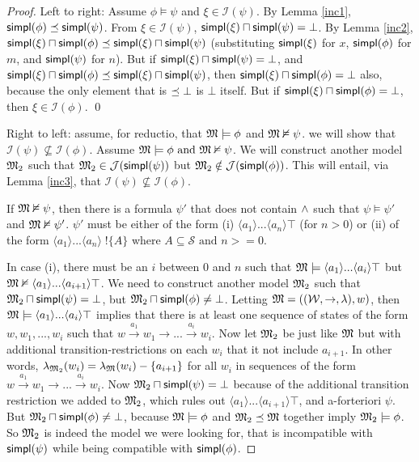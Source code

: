\begin{proof}

Left to right: Assume $\phi \models \psi$ and $\xi \in \mathcal{I}(\psi)$.  By
Lemma \ref{inc1}, $\mathsf{simpl}(\phi) \preceq \mathsf{simpl}(\psi)$.  From $\xi \in \mathcal{I}(\psi)$,
$\mathsf{simpl}(\xi) \sqcap \mathsf{simpl}(\psi) = \bot$.  By Lemma \ref{inc2}, $\mathsf{simpl}(\xi) \sqcap
\mathsf{simpl}(\phi) \preceq \mathsf{simpl}(\xi) \sqcap \mathsf{simpl}(\psi)$ (substituting $\mathsf{simpl}(\xi)$
for $x$, $\mathsf{simpl}(\phi)$ for $m$, and $\mathsf{simpl}(\psi)$ for $n$).  But if
$\mathsf{simpl}(\xi) \sqcap \mathsf{simpl}(\psi) = \bot$, and $\mathsf{simpl}(\xi) \sqcap \mathsf{simpl}(\phi)
\preceq \mathsf{simpl}(\xi) \sqcap \mathsf{simpl}(\psi)$, then $\mathsf{simpl}(\xi) \sqcap \mathsf{simpl}(\phi) =
\bot$ also, because the only element that is $\preceq \bot$ is $\bot$
itself.  But if $\mathsf{simpl}(\xi) \sqcap \mathsf{simpl}(\phi) = \bot$, then $\xi \in
\mathcal{I}(\phi)$.  \qed

Right to left: assume, for reductio, that $\frak{M} \models \phi$ and $\frak{M} \nvDash
\psi$. we will show that $\mathcal{I}(\psi) \nsubseteq \mathcal{I}(\phi)$.
Assume $\frak{M} \models \phi \mbox{ and } \frak{M} \nvDash \psi$. We will construct
another model $\frak{M}_2$ such that $\frak{M}_2 \in \mathcal{J}(\mathsf{simpl}(\psi))$ but $\frak{M}_2
\notin \mathcal{J}(\mathsf{simpl}(\phi))$.  This will entail, via Lemma \ref{inc3}, that
$\mathcal{I}(\psi) \nsubseteq \mathcal{I}(\phi)$.

If $\frak{M} \nvDash \psi$, then there is a formula $\psi'$ that does not contain
$\land$ such that $\psi \models \psi'$ and $\frak{M} \nvDash \psi'$. $\psi'$ must be
either of the form (i) $\langle a_1 \rangle ... \langle a_n \rangle
\top$ (for $n > 0$) or (ii) of the form $\langle a_1 \rangle
... \langle a_n \rangle \; !\{A\}$ where $A \subseteq \mathcal{S}
\mbox{ and } n >= 0$.

In case (i), there must be an $i$ between $0$ and $n$ such that $\frak{M}
\models \langle a_1 \rangle ... \langle a_i \rangle \top$ but $\frak{M}
\nvDash \langle a_1 \rangle ... \langle a_{i+1} \rangle \top$. We need
to construct another model $\frak{M}_2$ such that $\frak{M}_2 \sqcap \mathsf{simpl}(\psi) = \bot$,
but $\frak{M}_2 \sqcap \mathsf{simpl}(\phi) \neq \bot$. Letting $\frak{M} =
((\mathcal{W},\rightarrow,\lambda),w)$, then $\frak{M} \models \langle a_1
\rangle ... \langle a_i \rangle \top$ implies that there is at least
one sequence of states of the form $w, w_1, ..., w_i$ such that $w
\xrightarrow{a_1} w_1 \rightarrow ... \xrightarrow{a_i} w_i$.  Now let
$\frak{M}_2$ be just like $\frak{M}$ but with additional transition-restrictions on
each $w_i$ that it not include $a_{i+1}$.  In other words,
$\lambda_{\frak{M}_2}(w_i) = \lambda_\frak{M}(w_i) - \{a_{i+1}\}$ for all $w_i$ in
sequences of the form $w \xrightarrow{a_1} w_1 \rightarrow
... \xrightarrow{a_i} w_i$. Now $\frak{M}_2 \sqcap \mathsf{simpl}(\psi) = \bot$ because of
the additional transition restriction we added to $\frak{M}_2$, which rules out
$\langle a_1 \rangle ... \langle a_{i+1} \rangle \top$, and
a-forteriori $\psi$. But $\frak{M}_2 \sqcap \mathsf{simpl}(\phi) \neq \bot$, because $\frak{M}
\models \phi$ and $\frak{M}_2 \preceq \frak{M}$ together imply $\frak{M}_2 \models \phi$. So $\frak{M}_2$ is
indeed the model we were looking for, that is incompatible with
$\mathsf{simpl}(\psi)$ while being compatible with $\mathsf{simpl}(\phi)$.


\end{proof}
